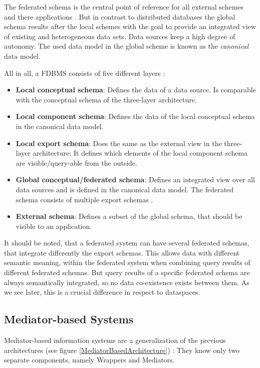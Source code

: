 The federated schema is the central point of reference for all external schemes and there applications \cite[p. 94]{DBLP:books/dp/LeserN2006}. But in contrast to distributed databases the global schema results after the local schemes with the goal to provide an integrated view of existing and heterogeneous data sets. Data sources keep a high degree of autonomy. The used data model in the global scheme is known as the \emph{canonical} data model. 

All in all, a FDBMS consists of five different layers \cite[p. 95]{DBLP:books/dp/LeserN2006}:

\begin{itemize}
\item \textbf{Local conceptual schema}: Defines the data of a data source. Is comparable with the conceptual schema of the three-layer architecture.
\item \textbf{Local component schema}: Defines the data of the local conceptual schema in the canonical data model. 
\item \textbf{Local export schema}: Does the same as the external view in the three-layer architecture: It defines which elements of the local component schema are visible/query-able from the outside.
\item \textbf{Global conceptual/federated schema}: Defines an integrated view over all data sources and is defined in the canonical data model. The federated schema consists of multiple export schemas \cite[p. 200]{Sheth:1990:FDS:96602.96604}.
\item \textbf{External schema}: Defines a subset of the global schema, that should be visible to an application.
\end{itemize}

It should be noted, that a federated system can have several federated schemas, that integrate differently the export schemas. This allows data with different semantic meaning, within the federated system when combining query results of different federated schemas. But query results of a specific federated schema are always semantically integrated, so no data co-existence exists between them. As we see later, this is a crucial difference in respect to dataspaces.

\subsection{Mediator-based Systems}

Mediator-based information systems are a generalization of the previous architectures (see figure \ref{MediatorBasedArchitecture}) \cite[p. 97]{DBLP:books/dp/LeserN2006}: They know only two separate components, namely Wrappers and Mediators. 

